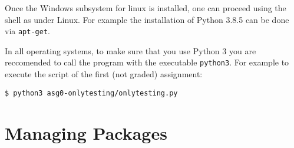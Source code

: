 Once the Windows subsystem for linux is installed, one can proceed using
the shell as under Linux. For example the installation of Python 3.8.5 can
be done via \lstinline{apt-get}.

In all operating systems, to make sure that you use Python 3 you are
reccomended to call the program with the
executable \lstinline{python3}. For example to execute the script of the
first (not graded) assignment:

\begin{lstlisting}
$ python3 asg0-onlytesting/onlytesting.py
\end{lstlisting}


\section*{Managing Packages} %

